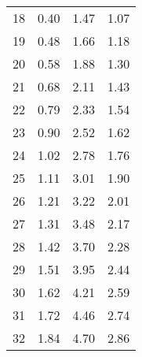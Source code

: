 \begin{longtable}[c]{cccc}
	18                       & 0.40                                    & 1.47                                    & 1.07                       \\
	19                       & 0.48                                    & 1.66                                    & 1.18                       \\
	20                       & 0.58                                    & 1.88                                    & 1.30                       \\
	21                       & 0.68                                    & 2.11                                    & 1.43                       \\
	22                       & 0.79                                    & 2.33                                    & 1.54                       \\
	23                       & 0.90                                    & 2.52                                    & 1.62                       \\
	24                       & 1.02                                    & 2.78                                    & 1.76                       \\
	25                       & 1.11                                    & 3.01                                    & 1.90                       \\
	26                       & 1.21                                    & 3.22                                    & 2.01                       \\
	27                       & 1.31                                    & 3.48                                    & 2.17                       \\
	28                       & 1.42                                    & 3.70                                    & 2.28                       \\
	29                       & 1.51                                    & 3.95                                    & 2.44                       \\
	30                       & 1.62                                    & 4.21                                    & 2.59                       \\
	31                       & 1.72                                    & 4.46                                    & 2.74                       \\
	32                       & 1.84                                    & 4.70                                    & 2.86                       \\

\end{longtable}
